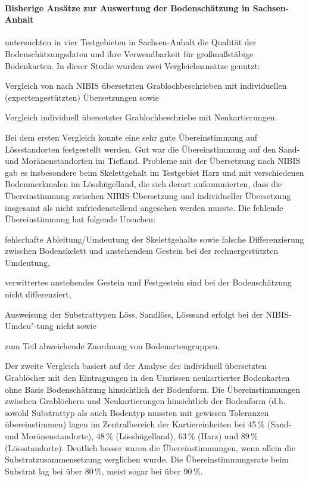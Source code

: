 \paragraph{Bisherige Ansätze zur Auswertung der Bodenschätzung in Sachsen-Anhalt}
\citet{Altermann-etal2003} untersuchten in vier Testgebieten in Sachsen-Anhalt die Qualität der Bodenschätzungsdaten und ihre Verwendbarkeit für großmaßstäbige Bodenkarten. In dieser Studie wurden zwei Vergleichsansätze genutzt:
\begin{compactenum}
\item Vergleich von nach NIBIS übersetzten Grablochbeschrieben mit individuellen (expertengestützten) Übersetzungen sowie
\item Vergleich individuell übersetzter Grablochbeschriebe mit Neukartierungen.

\end{compactenum}

Bei dem ersten Vergleich konnte eine sehr gute Übereinstimmung auf Lössstandorten festgestellt werden. Gut war die Übereinstimmung auf den Sand- und Moränenstandorten im Tiefland. Probleme mit der Übersetzung nach NIBIS gab es insbesondere beim Skelettgehalt im Testgebiet Harz und mit verschiedenen Bodenmerkmalen im Lösshügelland, die sich derart aufsummierten, dass die Übereinstimmung zwischen NIBIS-Übersetzung und individueller Übersetzung insgesamt als nicht zufriedenstellend angesehen werden musste.  Die fehlende Übereinstimmung hat folgende Ursachen:

\begin{compactitem}
\item fehlerhafte Ableitung/Umdeutung der Skelettgehalte sowie falsche Differenzierung zwischen Bodenskelett und anstehendem Gestein bei der rechnergestützten Umdeutung,
\item verwittertes anstehendes Gestein und Festgestein sind bei der Bodenschätzung nicht differenziert,
\item Ausweisung der Substrattypen Löss, Sandlöss, Lösssand erfolgt bei der NIBIS-Umdeu"-tung nicht sowie
\item zum Teil abweichende Zuordnung von Bodenartengruppen.
\end{compactitem}

Der zweite Vergleich basiert auf der Analyse der individuell übersetzten Grablöcher mit den Eintragungen in den Umrissen neukartierter Bodenkarten ohne Basis Bodenschätzung hinsichtlich der Bodenform. Die Übereinstimmungen zwischen Grablöchern und Neukartierungen hinsichtlich der Bodenform (d.h. sowohl Substrattyp als auch Bodentyp mussten mit gewissen Toleranzen übereinstimmen) lagen im Zentralbereich der Kartiereinheiten bei 45\,\% (Sand- und Moränenstandorte), 48\,\% (Lösshügelland), 63\,\% (Harz) und 89\,\% (Lössstandorte). Deutlich besser waren die Übereinstimmungen, wenn allein die Substratzusammensetzung verglichen wurde. Die Übereinstimmungsrate beim Substrat lag bei über 80\,\%, meist sogar bei über 90\,\%.\
 
